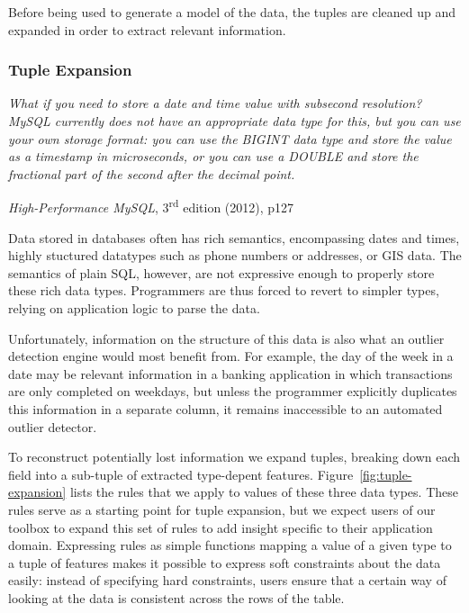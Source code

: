 
Before being used to generate a model of the data, the tuples are cleaned up and expanded in order to extract relevant information. 

\subsubsection{Tuple Expansion}

\indent\indent\begin{minipage}{0.8\linewidth}
  \itshape
  What if you need to store a date and time value with subsecond resolution? MySQL
  currently does not have an appropriate data type for this, but you can use your own
  storage format: you can use the BIGINT data type and store the value as a timestamp in
  microseconds, or you can use a DOUBLE and store the fractional part of the second after
  the decimal point.
\end{minipage}
\begin{flushright}
  \textit{High-Performance MySQL}, 3\textsuperscript{rd} edition (2012), p127
\end{flushright}

Data stored in databases often has rich semantics, encompassing dates and times, highly stuctured datatypes such as phone numbers or addresses, or GIS data. The semantics of plain SQL, however, are not expressive enough to properly store these rich data types. Programmers are thus forced to revert to simpler types, relying on application logic to parse the data. 

Unfortunately, information on the structure of this data is also what an outlier detection engine would most benefit from. For example, the day of the week in a date may be relevant information in a banking application in which transactions are only completed on weekdays, but unless the programmer explicitly duplicates this information in a separate column, it remains inaccessible to an automated outlier detector.

To reconstruct potentially lost information we expand tuples, breaking down each field into a sub-tuple of extracted type-depent features. Figure~\ref{fig:tuple-expansion} lists the rules that we apply to values of these three data types. These rules serve as a starting point for tuple expansion, but we expect users of our toolbox to expand this set of rules to add insight specific to their application domain. Expressing rules as simple functions mapping a value of a given type to a tuple of features makes it possible to express soft constraints about the data easily: instead of specifying hard constraints, users ensure that a certain way of looking at the data is consistent across the rows of the table.

